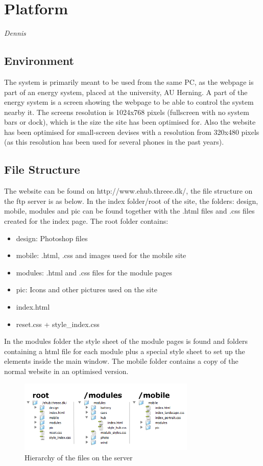 \newpage
\chapter{Platform} \textit{Dennis}
\section{Environment}
The system is primarily meant to be used from the same PC, as the webpage is part of an energy system,
placed at the university, AU Herning. A part of the energy system is a screen showing the webpage to
be able to control the system nearby it. The screens resolution is 1024x768 pixels (fullscreen with no system bars or dock), 
which is the size the site has been optimised for. Also the website has been optimised for small-screen devises with a resolution from 320x480 pixels (as this resolution has been used for several phones in the past years).
\section{File Structure}
The website can be found on http://www.ehub.threee.dk/, the file structure on the ftp server is as below. In the index folder/root of the site, the folders: design, mobile, modules and pic can be found together with the .html files and .css files created for the index page. The root folder contains:
\begin{itemize}
	\item design: Photoshop files
	\item mobile: .html, .css and images used for the mobile site
	\item modules: .html and .css files for the module pages
	\item pic: Icons and other pictures used on the site
	\item index.html
	\item reset.css + style\_index.css
\end{itemize}
In the modules folder the style sheet of the module pages is found and folders containing a html file for each module plus a special style sheet to set up the elements inside the main window. The mobile folder contains a copy of the normal website in an optimised version.

\begin{figure}[htbp]
	\center
	\includegraphics[width=0.75\textwidth]{images/hierarki.png} %
   	\caption{Hierarchy of the files on the server}
   	\label{fig:file_hierarki}
\end{figure}
\newpage
